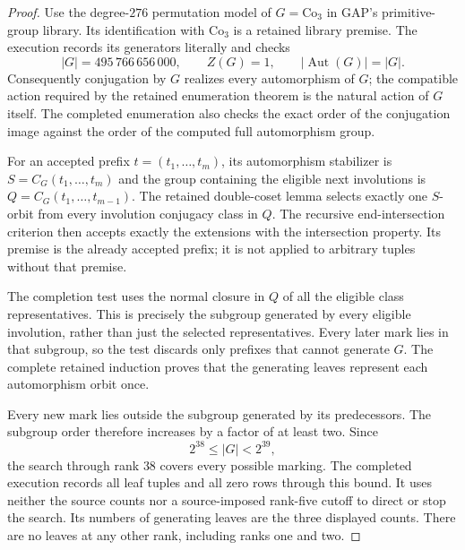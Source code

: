 \documentclass[11pt,a4paper]{article}
\begin{document}
\begin{proof}
Use the degree-$276$ permutation model of $G=\mathrm{Co}_3$ in
GAP's primitive-group library. Its identification with $\mathrm{Co}_3$
is a retained library premise. The execution records its generators
literally and checks
\[
 |G|=495\,766\,656\,000,\qquad Z(G)=1,
 \qquad |\operatorname{Aut}(G)|=|G|.
\]
Consequently conjugation by $G$ realizes every automorphism of $G$;
the compatible action required by the retained enumeration theorem
is the natural action of $G$ itself. The completed enumeration also
checks the exact order of the conjugation image against the order
of the computed full automorphism group.

For an accepted prefix $t=(t_1,\ldots,t_m)$, its automorphism
stabilizer is $S=C_G(t_1,\ldots,t_m)$ and the group containing
the eligible next involutions is
$Q=C_G(t_1,\ldots,t_{m-1})$. The retained double-coset lemma
selects exactly one $S$-orbit from every involution conjugacy class
in $Q$. The recursive end-intersection criterion then accepts
exactly the extensions with the intersection property. Its premise
is the already accepted prefix; it is not applied to arbitrary
tuples without that premise.

The completion test uses the normal closure in $Q$ of all the
eligible class representatives. This is precisely the subgroup
generated by every eligible involution, rather than just the selected
representatives. Every later mark lies in that subgroup, so the
test discards only prefixes that cannot generate $G$. The complete
retained induction proves that the generating leaves represent
each automorphism orbit once.

Every new mark lies outside the subgroup generated by its predecessors.
The subgroup order therefore increases by a factor of at least two.
Since
\[
                2^{38}\le |G|<2^{39},
\]
the search through rank $38$ covers every possible marking. The
completed execution records all leaf tuples and all zero rows
through this bound. It uses neither the source counts nor a
source-imposed rank-five cutoff to direct or stop the search.
Its numbers of generating leaves are the three displayed counts.
There are no leaves at any other rank, including ranks one and two.


\end{proof}
\end{document}
